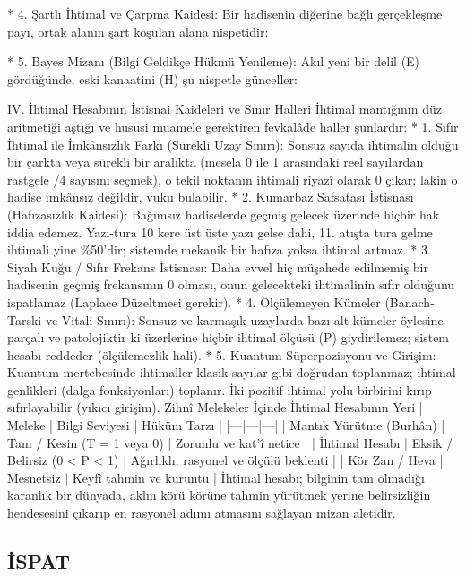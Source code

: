 \documentclass[11pt,a4paper]{article}
\begin{document}
 * 4. Şartlı İhtimal ve Çarpma Kaidesi: Bir hadisenin diğerine bağlı gerçekleşme payı, ortak alanın şart koşulan alana nispetidir:
   
 * 5. Bayes Mizanı (Bilgi Geldikçe Hükmü Yenileme): Akıl yeni bir delil (E) gördüğünde, eski kanaatini (H) şu nispetle günceller:
   
IV. İhtimal Hesabının İstisnai Kaideleri ve Sınır Halleri
İhtimal mantığının düz aritmetiği aştığı ve hususi muamele gerektiren fevkalâde haller şunlardır:
 * 1. Sıfır İhtimal ile İmkânsızlık Farkı (Sürekli Uzay Sınırı):
   Sonsuz sayıda ihtimalin olduğu bir çarkta veya sürekli bir aralıkta (mesela 0 ile 1 arasındaki reel sayılardan rastgele \pi/4 sayısını seçmek), o tekil noktanın ihtimali riyazî olarak 0 çıkar; lakin o hadise imkânsız değildir, vuku bulabilir.
 * 2. Kumarbaz Safsatası İstisnası (Hafızasızlık Kaidesi):
   Bağımsız hadiselerde geçmiş gelecek üzerinde hiçbir hak iddia edemez. Yazı-tura 10 kere üst üste yazı gelse dahi, 11. atışta tura gelme ihtimali yine \%50'dir; sistemde mekanik bir hafıza yoksa ihtimal artmaz.
 * 3. Siyah Kuğu / Sıfır Frekans İstisnası:
   Daha evvel hiç müşahede edilmemiş bir hadisenin geçmiş frekansının 0 olması, onun gelecekteki ihtimalinin sıfır olduğunu ispatlamaz (Laplace Düzeltmesi gerekir).
 * 4. Ölçülemeyen Kümeler (Banach-Tarski ve Vitali Sınırı):
   Sonsuz ve karmaşık uzaylarda bazı alt kümeler öylesine parçalı ve patolojiktir ki üzerlerine hiçbir ihtimal ölçüsü (P) giydirilemez; sistem hesabı reddeder (ölçülemezlik hali).
 * 5. Kuantum Süperpozisyonu ve Girişim:
   Kuantum mertebesinde ihtimaller klasik sayılar gibi doğrudan toplanmaz; ihtimal genlikleri (dalga fonksiyonları) toplanır. İki pozitif ihtimal yolu birbirini kırıp sıfırlayabilir (yıkıcı girişim).
Zihnî Melekeler İçinde İhtimal Hesabının Yeri
| Meleke | Bilgi Seviyesi | Hüküm Tarzı |
|---|---|---|
| Mantık Yürütme (Burhân) | Tam / Kesin (T = 1 veya 0) | Zorunlu ve kat'î netice |
| İhtimal Hesabı | Eksik / Belirsiz (0 < P < 1) | Ağırlıklı, rasyonel ve ölçülü beklenti |
| Kör Zan / Heva | Mesnetsiz | Keyfî tahmin ve kuruntu |
İhtimal hesabı; bilginin tam olmadığı karanlık bir dünyada, aklın körü körüne tahmin yürütmek yerine belirsizliğin hendesesini çıkarıp en rasyonel adımı atmasını sağlayan mizan aletidir.






\subsection{İSPAT}
\end{document}
